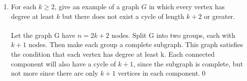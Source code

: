 \documentclass[12pt]{article}
\begin{document}
\begin{enumerate}
\begin{enumerate}
\item For each $k \geq 2$, give an example of a graph $G$ in which every vertex has degree at least $k$ but there does not exist a cycle of length $k+2$ or greater.\\\\
Let the graph G have $n=2k+2$ nodes. Split G into two groups, each with $k+1$ nodes. Then make each group a complete subgraph. This graph satisfies the condition that each vertex has degree at least k. Each connected component will also have a cycle of $k+1$, since the subgraph is complete, but not more since there are only $k+1$ vertices in each component.\qed
\end{enumerate}

\end{enumerate}
\end{document}
